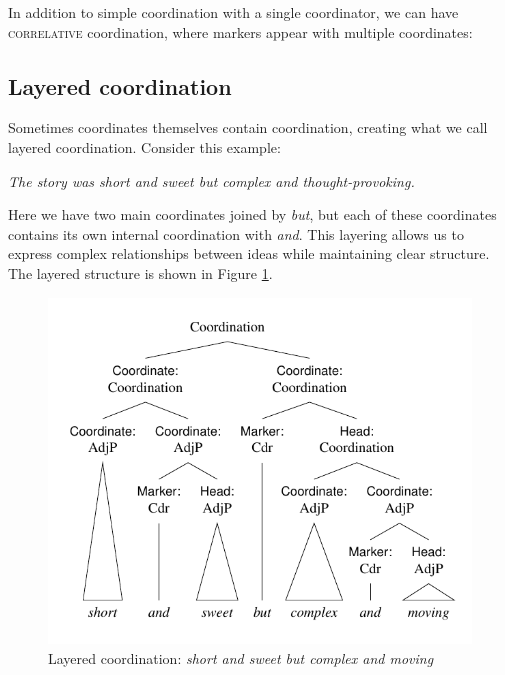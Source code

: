 In addition to simple coordination with a single coordinator, we can have \textsc{correlative} coordination, where markers appear with multiple coordinates:

\ea \label{ex:coord-correlative}
    \z
\z

\subsection{Layered coordination}

Sometimes coordinates themselves contain coordination, creating what we call layered coordination. Consider this example:

\ea \label{ex:coord-layered}
\textit{The story was {\ob}short and sweet{\cb} but {\ob}complex and thought-provoking{\cb}.}
\z

Here we have two main coordinates joined by \textit{but}, but each of these coordinates contains its own internal coordination with \textit{and}. This layering allows us to express complex relationships between ideas while maintaining clear structure. The layered structure is shown in Figure \ref{fig:coord-layered}.

\begin{figure}
    \centering
    \includegraphics[width=0.9\linewidth]{figures/short and sweet but complex and moving.pdf}
    \caption{Layered coordination: \textit{short and sweet but complex and moving}}\label{fig:coord-layered}
\end{figure}


